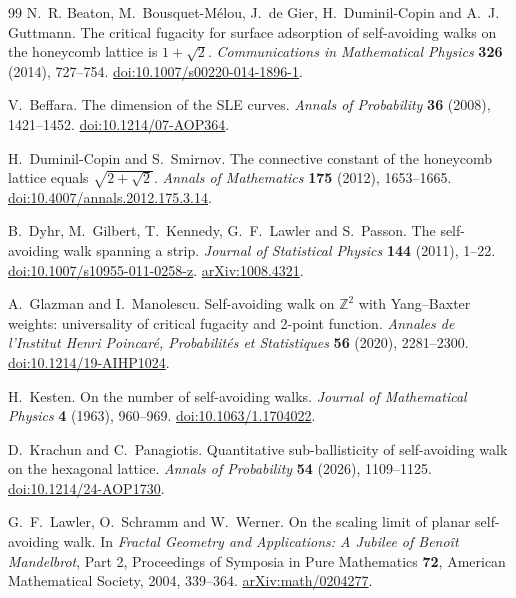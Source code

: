\begin{thebibliography}{99}
N.~R. Beaton, M.~Bousquet-M\'elou, J.~de Gier, H.~Duminil-Copin and A.~J. Guttmann.
The critical fugacity for surface adsorption of self-avoiding walks on the honeycomb lattice is $1+\sqrt2$.
\emph{Communications in Mathematical Physics} \textbf{326} (2014), 727--754.
\href{https://doi.org/10.1007/s00220-014-1896-1}{doi:10.1007/s00220-014-1896-1}.

V.~Beffara.
The dimension of the SLE curves.
\emph{Annals of Probability} \textbf{36} (2008), 1421--1452.
\href{https://doi.org/10.1214/07-AOP364}{doi:10.1214/07-AOP364}.

H.~Duminil-Copin and S.~Smirnov.
The connective constant of the honeycomb lattice equals $\sqrt{2+\sqrt2}$.
\emph{Annals of Mathematics} \textbf{175} (2012), 1653--1665.
\href{https://doi.org/10.4007/annals.2012.175.3.14}{doi:10.4007/annals.2012.175.3.14}.

B.~Dyhr, M.~Gilbert, T.~Kennedy, G.~F.~Lawler and S.~Passon.
The self-avoiding walk spanning a strip.
\emph{Journal of Statistical Physics} \textbf{144} (2011), 1--22.
\href{https://doi.org/10.1007/s10955-011-0258-z}{doi:10.1007/s10955-011-0258-z}.
\href{https://arxiv.org/abs/1008.4321}{arXiv:1008.4321}.

A.~Glazman and I.~Manolescu.
Self-avoiding walk on $\mathbb Z^2$ with Yang--Baxter weights: universality of critical fugacity and 2-point function.
\emph{Annales de l'Institut Henri Poincar\'e, Probabilit\'es et Statistiques}
\textbf{56} (2020), 2281--2300.
\href{https://doi.org/10.1214/19-AIHP1024}{doi:10.1214/19-AIHP1024}.

H.~Kesten.
On the number of self-avoiding walks.
\emph{Journal of Mathematical Physics} \textbf{4} (1963), 960--969.
\href{https://doi.org/10.1063/1.1704022}{doi:10.1063/1.1704022}.

D.~Krachun and C.~Panagiotis.
Quantitative sub-ballisticity of self-avoiding walk on the hexagonal lattice.
\emph{Annals of Probability} \textbf{54} (2026), 1109--1125.
\href{https://doi.org/10.1214/24-AOP1730}{doi:10.1214/24-AOP1730}.

G.~F.~Lawler, O.~Schramm and W.~Werner.
On the scaling limit of planar self-avoiding walk.
In \emph{Fractal Geometry and Applications: A Jubilee of Beno\^it Mandelbrot},
Part 2, Proceedings of Symposia in Pure Mathematics \textbf{72},
American Mathematical Society, 2004, 339--364.
\href{https://arxiv.org/abs/math/0204277}{arXiv:math/0204277}.


\end{thebibliography}
